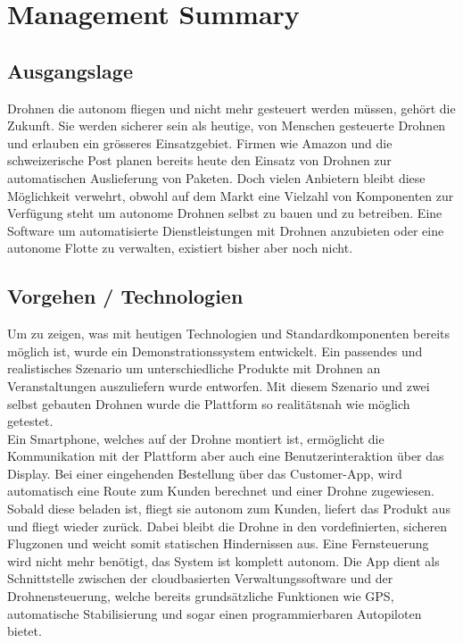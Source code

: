 \newpage
{}
\chapter*{Management Summary}
\section*{Ausgangslage}
Drohnen die autonom fliegen und nicht mehr gesteuert werden müssen, gehört die Zukunft. Sie werden sicherer sein als heutige, von Menschen gesteuerte Drohnen und erlauben ein grösseres Einsatzgebiet. Firmen wie Amazon und die schweizerische Post planen bereits heute den Einsatz von Drohnen zur automatischen Auslieferung von Paketen. Doch vielen Anbietern bleibt diese Möglichkeit verwehrt, obwohl auf dem Markt eine Vielzahl von Komponenten zur Verfügung steht um autonome Drohnen selbst zu bauen und zu betreiben. Eine Software um automatisierte Dienstleistungen mit Drohnen anzubieten oder eine autonome Flotte zu verwalten, existiert bisher aber noch nicht.

\section*{Vorgehen / Technologien}
Um zu zeigen, was mit heutigen Technologien und Standardkomponenten bereits möglich ist, wurde ein Demonstrationssystem entwickelt. Ein passendes und realistisches Szenario um unterschiedliche Produkte mit Drohnen an Veranstaltungen auszuliefern wurde entworfen. Mit diesem Szenario und zwei selbst gebauten Drohnen wurde die Plattform so realitätsnah wie möglich getestet.  \\

Ein Smartphone, welches auf der Drohne montiert ist, ermöglicht die Kommunikation mit der Plattform aber auch eine Benutzerinteraktion über das Display. Bei einer eingehenden Bestellung über das Customer-App, wird automatisch eine Route zum Kunden berechnet und einer Drohne zugewiesen. Sobald diese beladen ist, fliegt sie autonom zum Kunden, liefert das Produkt aus und fliegt wieder zurück. Dabei bleibt die Drohne in den vordefinierten, sicheren Flugzonen und weicht somit statischen Hindernissen aus. Eine Fernsteuerung wird nicht mehr benötigt, das System ist komplett autonom. Die App dient als Schnittstelle zwischen der cloudbasierten Verwaltungssoftware und der Drohnensteuerung, welche bereits grundsätzliche Funktionen wie GPS, automatische Stabilisierung und sogar einen programmierbaren Autopiloten bietet.

